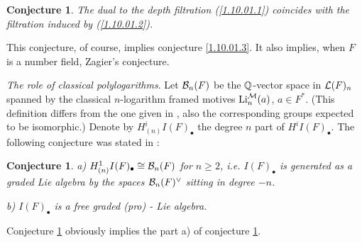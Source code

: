 \documentclass[10pt]{article}
\newtheorem{conjecture}[theorem]{Conjecture}
\begin{document}
\begin{conjecture} \label{13.1.01.1}
The dual to the depth filtration (\ref{1.10.01.1}) coincides with the 
filtration induced by (\ref{1.10.01.2}). 
\end{conjecture}
This conjecture, of course, implies conjecture \ref{1.10.01.3}. 
It also implies, when $F$ is a number field, Zagier's conjecture. 


{\it The role of classical polylogarithms}. Let  ${\cal B}_{n}(F)$ be 
the ${\mathbb Q}$-vector space in 
${\cal L}(F)_{n}$ spanned by the classical $n$-logarithm framed motives 
${\rm Li}^{{\cal M}}_n(a)$, $a \in F^*$. (This definition differs 
from the one given in \cite{G6,G7}, also the corresponding groups  expected to be isomorphic.) 
Denote by  $H^{i}_{(n)}I(F)_{\bullet}$  the degree $n$ part of $H^{i}I(F)_{\bullet}$.
The following conjecture was stated in \cite{G1}:

\begin{conjecture} \label{7.3}
a)  $H^{1}_{(n)}I(F)_{\bullet} \cong {\cal
B}_{n}(F)$ for $n\geq 2$, i.e. $ I(F)_{\bullet}$ 
is generated as a graded Lie algebra by the spaces ${\cal
B}_{n}(F)^{\vee}$ sitting in degree $-n$.

b) $I(F)_{\bullet}$  is a free graded (pro) -
Lie algebra.
\end{conjecture}

Conjecture \ref{13.1.01.1} obviously implies the part a) of conjecture \ref{7.3}. 
\end{document}
